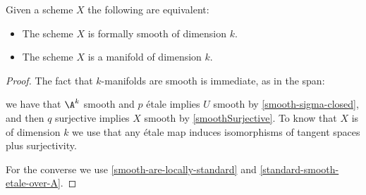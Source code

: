 \begin{proposition}\label{smooth-scheme-manifold}
Given a scheme $X$ the following are equivalent:
\begin{itemize}
\item The scheme $X$ is formally smooth of dimension $k$.
\item The scheme $X$ is a manifold of dimension $k$.
\end{itemize}
\end{proposition}

\begin{proof}
The fact that $k$-manifolds are smooth is immediate, as in the span:
 \begin{center}
\end{center}
we have that $\A^k$ smooth and $p$ étale implies $U$ smooth by \cref{smooth-sigma-closed},
and then $q$ surjective implies $X$ smooth by \cref{smoothSurjective}. To know that $X$ is of dimension $k$ we use that any étale map induces isomorphisms of tangent spaces plus surjectivity.

For the converse we use \cref{smooth-are-locally-standard} and \cref{standard-smooth-etale-over-A}.
\end{proof}


